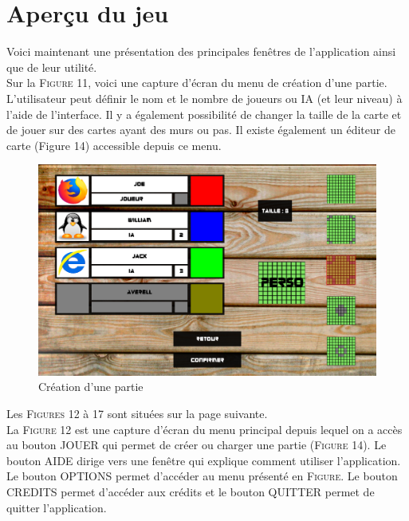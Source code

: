 \documentclass[11pt,a4paper]{article}
\begin{document}
\newpage

\part{Aperçu du jeu}

Voici maintenant une présentation des principales fenêtres de l'application ainsi que de leur utilité.\\

Sur la \textsc{Figure} 11, voici une capture d'écran du menu de création d'une partie. L'utilisateur peut définir le nom et le nombre de joueurs ou IA (et leur niveau) à l'aide de l'interface. Il y a également possibilité de changer la taille de la carte et de jouer sur des cartes ayant des murs ou pas. Il existe également un éditeur de carte (Figure 14) accessible depuis ce menu.\\

\begin{figure}[h]
\begin{center}
\includegraphics[width=1\textwidth]{figures/captureJeu/captureCreer.png}
\caption{Création d'une partie}
\label{fig:creer}
\end{center}
\end{figure}

Les \textsc{Figures} 12 à 17 sont situées sur la page suivante.\\

La \textsc{Figure} 12 est une capture d'écran du menu principal depuis lequel on a accès au bouton JOUER qui permet de créer ou charger une partie (\textsc{Figure} 14). Le bouton AIDE dirige vers une fenêtre qui explique comment utiliser l'application. Le bouton OPTIONS permet d'accéder au menu présenté en \textsc{Figure}. Le bouton CREDITS permet d'accéder aux crédits et le bouton QUITTER permet de quitter l'application.\\
\end{document}

